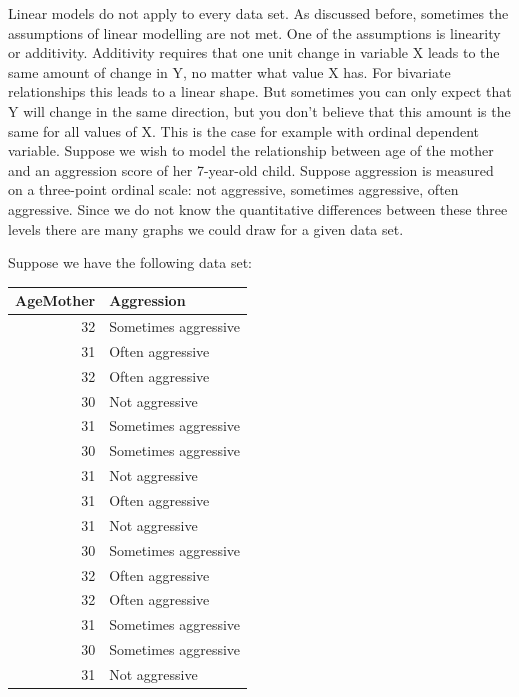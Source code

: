 \documentclass[]{report}\usepackage[]{graphicx}\usepackage[]{color}
\newenvironment{knitrout}{}{} %
\begin{document}
Linear models do not apply to every data set. As discussed before, sometimes the assumptions of linear modelling are not met. One of the assumptions is linearity or additivity. Additivity requires that one unit change in variable X leads to the same amount of change in Y, no matter what value X has. For bivariate relationships this leads to a linear shape. But sometimes you can only expect that Y will change in the same direction, but you don't believe that this amount is the same for all values of X. This is the case for example with ordinal dependent variable. Suppose we wish to model the relationship between age of the mother and an aggression score of her 7-year-old child. Suppose aggression is measured on a three-point ordinal scale: not aggressive, sometimes aggressive, often aggressive. Since we do not know the quantitative differences between these three levels there are many graphs we could draw for a given data set.


Suppose we have the following data set:


\begin{knitrout}
\color{fgcolor}
\begin{tabular}{r|l}
\hline
AgeMother & Aggression\\
\hline
32 & Sometimes aggressive\\
\hline
31 & Often aggressive\\
\hline
32 & Often aggressive\\
\hline
30 & Not aggressive\\
\hline
31 & Sometimes aggressive\\
\hline
30 & Sometimes aggressive\\
\hline
31 & Not aggressive\\
\hline
31 & Often aggressive\\
\hline
31 & Not aggressive\\
\hline
30 & Sometimes aggressive\\
\hline
32 & Often aggressive\\
\hline
32 & Often aggressive\\
\hline
31 & Sometimes aggressive\\
\hline
30 & Sometimes aggressive\\
\hline
31 & Not aggressive\\
\hline
\end{tabular}


\end{knitrout}
\end{document}
